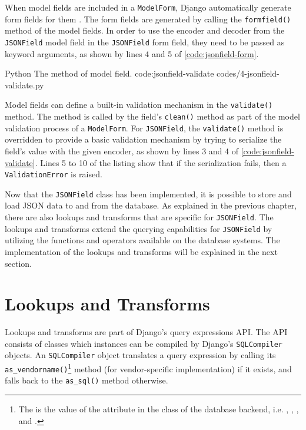When model fields are included in a \verb|ModelForm|, Django automatically
generate form fields for them \cite{django:modelform}. The form fields are
generated by calling the \verb|formfield()| method of the model fields. In
order to use the encoder and decoder from the \verb|JSONField| model field in
the \verb|JSONField| form field, they need to be passed as keyword arguments,
as shown by lines 4 and 5 of \autoref{code:jsonfield-form}.

\listing
{Python}
{The  method of  model field.}
{code:jsonfield-validate}
{codes/4-jsonfield-validate.py}

Model fields can define a built-in validation mechanism in the
\verb|validate()| method. The method is called by the field's \verb|clean()|
method as part of the model validation process of a \verb|ModelForm|. For
\verb|JSONField|, the \verb|validate()| method is overridden to provide a
basic validation mechanism by trying to serialize the field's value with the
given encoder, as shown by lines 3 and 4 of \autoref{code:jsonfield-validate}.
Lines 5 to 10 of the listing show that if the serialization fails, then a
\verb|ValidationError| is raised.

Now that the \verb|JSONField| class has been implemented, it is possible to
store and load JSON data to and from the database. As explained in the previous
chapter, there are also lookups and transforms that are specific for
\verb|JSONField|. The lookups and transforms extend the querying capabilities
for \verb|JSONField| by utilizing the functions and operators available on the
database systems. The implementation of the lookups and transforms will be
explained in the next section.

\section{ Lookups and Transforms}

Lookups and transforms are part of Django's query expressions API. The API
consists of classes which instances can be compiled by Django's
\verb|SQLCompiler| objects. An \verb|SQLCompiler| object translates a query
expression by calling its \verb|as_vendorname()|\footnote{The 
is the value of the  attribute in the  class
of the database backend, i.e. , , ,
and .} method (for vendor-specific implementation) if it exists,
and falls back to the \verb|as_sql()| method otherwise.


